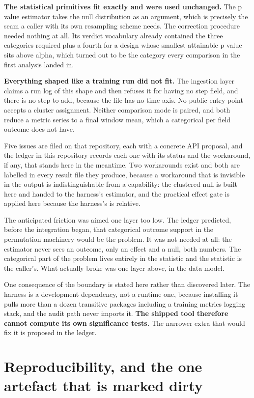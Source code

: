 \textbf{The statistical primitives fit exactly and were used unchanged.} The p
value estimator takes the null distribution as an argument, which is precisely
the seam a caller with its own resampling scheme needs. The correction procedure
needed nothing at all. Its verdict vocabulary already contained the three
categories required plus a fourth for a design whose smallest attainable p value
sits above alpha, which turned out to be the category every comparison in the
first analysis landed in.

\textbf{Everything shaped like a training run did not fit.} The ingestion layer
claims a run log of this shape and then refuses it for having no step field, and
there is no step to add, because the file has no time axis. No public entry point
accepts a cluster assignment. Neither comparison mode is paired, and both reduce
a metric series to a final window mean, which a categorical per field outcome
does not have.

Five issues are filed on that repository, each with a concrete API proposal, and
the ledger in this repository records each one with its status and the
workaround, if any, that stands here in the meantime. Two workarounds exist and
both are labelled in every result file they produce, because a workaround that is
invisible in the output is indistinguishable from a capability: the clustered
null is built here and handed to the harness's estimator, and the practical
effect gate is applied here because the harness's is relative.

The anticipated friction was aimed one layer too low. The ledger predicted,
before the integration began, that categorical outcome support in the permutation
machinery would be the problem. It was not needed at all: the estimator never
sees an outcome, only an effect and a null, both numbers. The categorical part of
the problem lives entirely in the statistic and the statistic is the caller's.
What actually broke was one layer above, in the data model.

One consequence of the boundary is stated here rather than discovered later. The
harness is a development dependency, not a runtime one, because installing it
pulls more than a dozen transitive packages including a training metrics logging
stack, and the audit path never imports it. \textbf{The shipped tool therefore
cannot compute its own significance tests.} The narrower extra that would fix it
is proposed in the ledger.

\section{Reproducibility, and the one artefact that is marked dirty}

